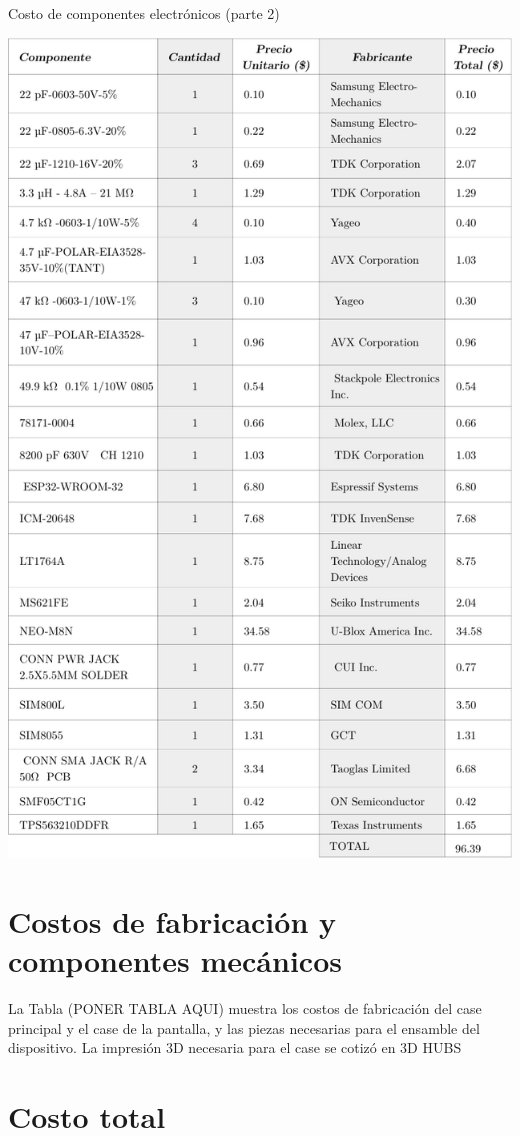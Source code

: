 \begin{table}[htbp!]
  \centering
  \caption{Costo de componentes electrónicos (parte 2)}
  \label{diag:costos_elec_2}
  \includegraphics[width=0.9\linewidth]{BOM_2.pdf}
\end{table}

\section{Costos de fabricación y componentes mecánicos}
La Tabla (PONER TABLA AQUI) muestra los costos de fabricación del case principal y el case de la pantalla, y las piezas necesarias para el ensamble del dispositivo. La impresión 3D necesaria para el case se cotizó en 3D HUBS
\section{Costo total}



